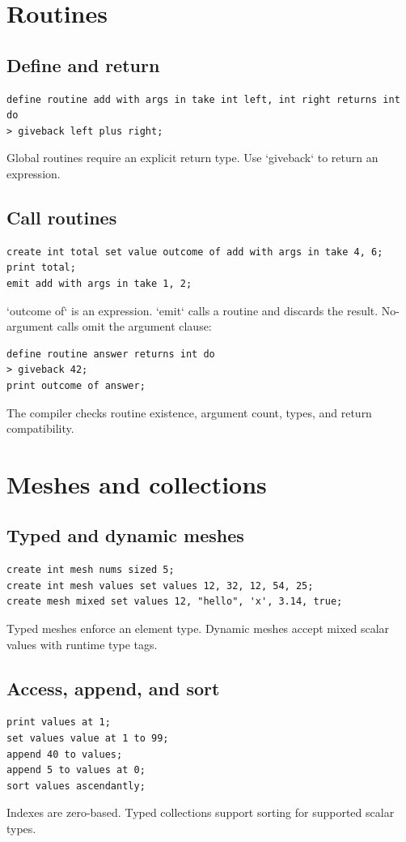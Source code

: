 \documentclass[10.5pt,a4paper]{article}
\begin{document}
\section{Routines}
\subsection{Define and return}
\begin{lstlisting}
define routine add with args in take int left, int right returns int do
> giveback left plus right;
\end{lstlisting}
Global routines require an explicit return type. Use `giveback` to return an expression.
\subsection{Call routines}
\begin{lstlisting}
create int total set value outcome of add with args in take 4, 6;
print total;
emit add with args in take 1, 2;
\end{lstlisting}
`outcome of` is an expression. `emit` calls a routine and discards the result. No-argument calls omit the argument clause:
\begin{lstlisting}
define routine answer returns int do
> giveback 42;
print outcome of answer;
\end{lstlisting}
The compiler checks routine existence, argument count, types, and return compatibility.
\section{Meshes and collections}
\subsection{Typed and dynamic meshes}
\begin{lstlisting}
create int mesh nums sized 5;
create int mesh values set values 12, 32, 12, 54, 25;
create mesh mixed set values 12, "hello", 'x', 3.14, true;
\end{lstlisting}
Typed meshes enforce an element type. Dynamic meshes accept mixed scalar values with runtime type tags.
\subsection{Access, append, and sort}
\begin{lstlisting}
print values at 1;
set values value at 1 to 99;
append 40 to values;
append 5 to values at 0;
sort values ascendantly;
\end{lstlisting}
Indexes are zero-based. Typed collections support sorting for supported scalar types.
\end{document}
